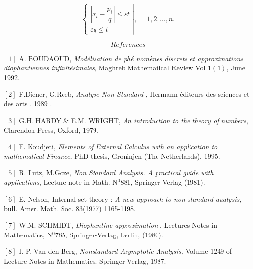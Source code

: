 \documentclass[12pt]{article}
\begin{document}
\begin{equation*}
\left\{ 
\begin{array}{c}
\left\vert x_{i}-\dfrac{p_{i}}{q}\right\vert \leq \varepsilon t \\ 
\varepsilon q\leq t%
\end{array}%
\right\vert ,=1,2,...,n\text{.}
\end{equation*}

\begin{equation*}
References
\end{equation*}

\noindent $\left[ 1\right] $ A. BOUDAOUD, \textit{Mod\'{e}lisation de ph\'{e}%
nom\`{e}nes discrets et approximations diophantiennes infinit\'{e}simales},
Maghreb Mathematical Review Vol 1$\left( 1\right) $, June 1992.

\noindent $\left[ 2\right] $ F.Diener, G.Reeb, \textit{Analyse Non Standard}%
, Hermann \'{e}diteurs des sciences et des arts . 1989 .

\noindent $\left[ 3\right] $ G.H. HARDY \& E.M. WRIGHT, \textit{An
introduction to the theory of numbers}, Clarendon Press, Oxford, 1979.

\noindent $\left[ 4\right] $ F. Koudjeti, \textit{Elements of External
Calculus with an application to mathematical Finance, }PhD thesis, Groninjen
(The Netherlands), 1995.

\noindent $\left[ 5\right] $ R. Lutz, M.Goze, \textit{Non Standard Analysis.
A practical guide with applications}, Lecture note in Math. N$^{0}$881,
Springer Verlag (1981).

\noindent $\left[ 6\right] $ E. Nelson, Internal set theory : \textit{A new
approach to non standard analysis}, bull. Amer. Math. Soc. 83(1977)
1165-1198.

\noindent $\left[ 7\right] $ W.M. SCHMIDT, \textit{Diophantine approximation}%
, Lectures Notes in Mathematics, N$^{0}$785, Springer-Verlag, berlin, (1980).

\noindent $\left[ 8\right] $ I. P. Van den Berg, \textit{Nonstandard
Asymptotic Analysis, }Volume 1249 of Lecture Notes in Mathematics. Springer
Verlag, 1987.

\newpage
\end{document}
